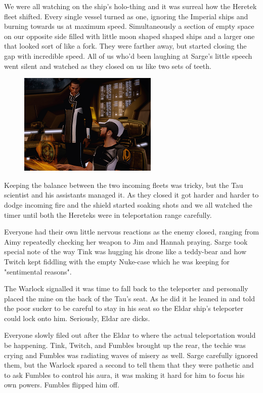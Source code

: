 We were all watching on the ship's holo-thing and it was surreal how the Heretek fleet shifted. 
Every single vessel turned as one, ignoring the Imperial ships and burning towards us at maximum speed. 
Simultaneously a section of empty space on our opposite side filled with little moon shaped shaped ships and a larger one that looked sort of like a fork. 
They were farther away, but started closing the gap with incredible speed. 
All of us who'd been laughing at Sarge's little speech went silent and watched as they closed on us like two sets of teeth.

\begin{figure}
	\begin{center}
		\includegraphics[width=\figwidth]{pics/11/89.png}
	\end{center}
\end{figure}
Keeping the balance between the two incoming fleets was tricky, but the Tau scientist and his assistants managed it. 
As they closed it got harder and harder to dodge incoming fire and the shield started soaking shots and we all watched the timer until both the Hereteks were in teleportation range carefully. 


Everyone had their own little nervous reactions as the enemy closed, ranging from Aimy repeatedly checking her weapon to Jim and Hannah praying. 
Sarge took special note of the way Tink was hugging his drone like a teddy-bear and how Twitch kept fiddling with the empty Nuke-case which he was keeping for "sentimental reasons". 


The Warlock signalled it was time to fall back to the teleporter and personally placed the mine on the back of the Tau's seat. 
As he did it he leaned in and told the poor sucker to be careful to stay in his seat so the Eldar ship's teleporter could lock onto him. 
Seriously, Eldar are dicks.

Everyone slowly filed out after the Eldar to where the actual teleportation would be happening. 
Tink, Twitch, and Fumbles brought up the rear, the techie was crying and Fumbles was radiating waves of misery as well. 
Sarge carefully ignored them, but the Warlock spared a second to tell them that they were pathetic and to ask Fumbles to control his aura, it was making it hard for him to focus his own powers. 
Fumbles flipped him off.

